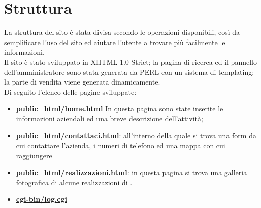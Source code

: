 \section{Struttura}{
	La struttura del sito è stata divisa secondo le operazioni disponibili, così da semplificare l'uso del sito ed aiutare l'utente a trovare più facilmente le informazioni.
	\\
	Il sito è stato sviluppato in XHTML 1.0 Strict; la pagina di ricerca ed il pannello dell'amministratore sono stata generata da PERL con un sistema di templating; la parte di vendita viene generata dinamicamente.
	\\
	Di seguito l'elenco delle pagine sviluppate:
	\begin{itemize}
		\item \textbf{\url{ public_html/home.html}} In questa pagina sono state inserite le informazioni aziendali ed una breve descrizione dell'attività; 
		\item \textbf{\url{public_html/contattaci.html}}: all'interno della quale si trova una form da cui contattare l'azienda, i numeri di telefono ed una mappa con cui raggiungere \textbf{\ggt} 
		\item \textbf{\url{public_html/realizzazioni.html}}: in questa pagina si trova una galleria fotografica di alcune realizzazioni di \textbf{\ggt}.
		\item \textbf{\url{cgi-bin/log.cgi}} 
	\end{itemize}
}
